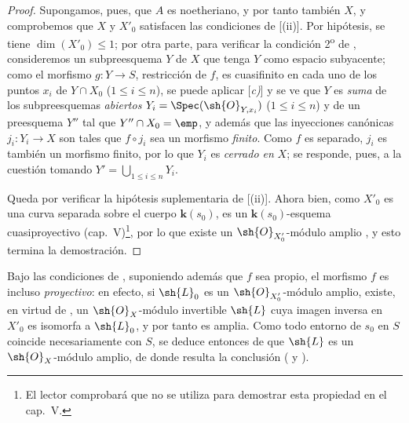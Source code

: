 \begin{proof}
Supongamos, pues, que $A$ es noetheriano, y por tanto también $X$, y comprobemos que $X$ y $X'_0$ satisfacen las condiciones de [(ii)].
Por hipótesis, se tiene $\dim(X'_0)\leq1$;
por otra parte, para verificar la condición 2\textsuperscript{o} de , consideremos un subpreesquema $Y$ de $X$ que tenga $Y$ como espacio subyacente;
como el morfismo $g:Y\to S$, restricción de $f$, es cuasifinito en cada uno de los puntos $x_i$ de $Y\cap X_0$ ($1\leq i\leq n$), se puede aplicar [\emph{c)}] y se ve que $Y$ es \emph{suma} de los subpreesquemas \emph{abiertos} $Y_i=\Spec(\sh{O}_{Y,x_i})$ ($1\leq i\leq n$) y de un preesquema $Y''$ tal que $Y''\cap X_0=\emp$, y además que las inyecciones canónicas $j_i:Y_i\to X$ son tales que $f\circ j_i$ sea un morfismo \emph{finito}.
Como $f$ es separado, $j_i$ es también un morfismo finito, por lo que $Y_i$ es \emph{cerrado en} $X$;
se responde, pues, a la cuestión tomando $Y'=\bigcup_{1\leq i\leq n}Y_i$.

Queda por verificar la hipótesis suplementaria de [(ii)].
Ahora bien, como $X'_0$ es una curva separada sobre el cuerpo $\boldsymbol{k}(s_0)$, es un $\boldsymbol{k}(s_0)$-esquema cuasiproyectivo (cap.~V)\footnote{El lector comprobará que  no se utiliza para demostrar esta propiedad en el cap.~V.}, por lo que existe un $\sh{O}_{X'_0}$-módulo amplio , y esto termina la demostración.
\end{proof}

\begin{remark}[21.9.13]
\label{IV.21.9.13}
Bajo las condiciones de , suponiendo además que $f$ sea propio, el morfismo $f$ es incluso \emph{proyectivo}:
en efecto, si $\sh{L}_0$ es un $\sh{O}_{X'_0}$-módulo amplio, existe, en virtud de , un $\sh{O}_X$-módulo invertible $\sh{L}$ cuya imagen inversa en $X'_0$ es isomorfa a $\sh{L}_0$, y por tanto es amplia.
Como todo entorno de $s_0$ en $S$ coincide necesariamente con $S$, se deduce entonces de  que $\sh{L}$ es un $\sh{O}_X$-módulo amplio, de donde resulta la conclusión ( y ).
\end{remark}
